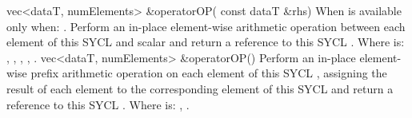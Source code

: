   \addRowTwoL
  {vec<dataT, numElements> \&operatorOP(}
  {  const dataT \&rhs)}
  {
    When  is \codeinline{\%=} available only when: .
    \newline
    Perform an in-place element-wise  arithmetic operation between each element of this SYCL  and  scalar and return a reference to this SYCL .
    \newline \newline
    Where  is: \codeinline{+=}, \codeinline{-=}, \codeinline{*=}, \codeinline{/=}, \codeinline{\%=}.
  }
  \addRow
  {vec<dataT, numElements> \&operatorOP()}
  {
    Perform an in-place element-wise  prefix arithmetic operation on each element of this SYCL , assigning the result of each element to the corresponding element of this SYCL  and return a reference to this SYCL .
    \newline \newline
    Where  is: \codeinline{++}, \codeinline{--}. 
  }
  
